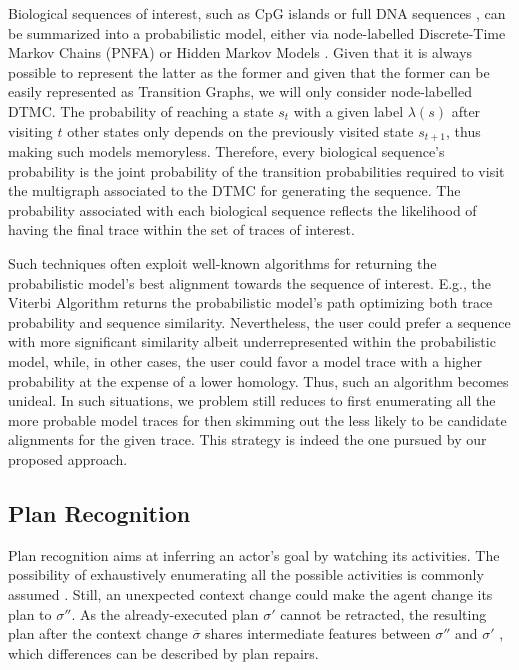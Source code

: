 Biological sequences of interest, such as CpG islands \cite{kxq005} or full DNA sequences \cite{BISHOP1986159}, can be summarized into a probabilistic model, either via node-labelled Discrete-Time Markov Chains (PNFA) \cite{RyabkoU08} or Hidden Markov Models \cite{Helske2018}. Given that it is always possible to represent the latter as the former \cite{DUPONT20051349} and given that the former can be easily represented as Transition Graphs, we will only consider node-labelled DTMC. The probability of reaching a state $s_t$ with a given label $\lambda(s)$ after visiting $t$ other states only depends on the previously visited state $s_{t+1}$, thus making such models memoryless. Therefore, every biological sequence's probability is the joint probability of the transition probabilities required to visit the multigraph associated to the DTMC for generating the sequence. The probability associated with each biological sequence reflects the likelihood of having the final trace within the set of traces of interest. 

Such techniques often exploit well-known algorithms for returning the probabilistic model's best alignment towards the sequence of interest. E.g., the Viterbi Algorithm \cite{Viterbi67} returns the probabilistic model's path optimizing both trace probability and sequence similarity.  Nevertheless, the user could prefer a sequence with more significant similarity albeit underrepresented within the probabilistic model, while, in other cases, the user could favor a model trace with a higher probability at the expense of a lower homology. Thus, such an algorithm becomes unideal. In such situations, we problem still reduces to first enumerating all the more probable model traces for then skimming out the less likely to be candidate alignments for the given trace. This strategy is indeed the one pursued by our proposed approach. 


\subsection{Plan Recognition}
Plan recognition aims at inferring an actor's goal  by watching its activities. The possibility of exhaustively enumerating all the possible activities is commonly assumed  \cite{RamirezG09}. Still,  %
an unexpected context change could make the agent change its plan to $\sigma''$. As the already-executed plan $\sigma'$ cannot be retracted, the resulting plan after the context change $\overline{\sigma}$ shares intermediate features between $\sigma''$ and $\sigma'$ \cite{FoxGLS06}, which differences can be described by plan repairs.